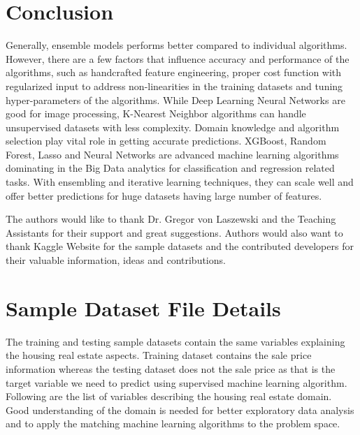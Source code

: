 \documentclass[sigconf]{acmart}
\begin{document}
	
	\section{Conclusion}
	
	Generally, ensemble models performs better compared to individual algorithms. However, there are a few factors that influence accuracy and performance of the algorithms, such as handcrafted feature engineering, proper cost function with regularized input to address non-linearities in the training datasets and tuning hyper-parameters of the algorithms. While Deep Learning Neural Networks are good for image processing, K-Nearest Neighbor algorithms can handle unsupervised datasets with less complexity. Domain knowledge and algorithm selection play vital role in getting accurate predictions. XGBoost, Random Forest, Lasso and Neural Networks are advanced machine learning algorithms dominating in the Big Data analytics for classification and regression related tasks. With ensembling and iterative learning techniques, they can scale well and offer better predictions for huge datasets having large number of features. 
	
	\appendix
	
	\nocite{*}
	
	\begin{acks}	
		The authors would like to thank Dr. Gregor von Laszewski and the Teaching Assistants for their support and great suggestions. Authors would also want to thank Kaggle Website for the sample datasets and the contributed developers for their valuable information, ideas and contributions.		
	\end{acks}
	
	
	
	 	
	
	\section{Sample Dataset File Details}
	The training and testing sample datasets contain the same variables explaining the housing real estate aspects. Training dataset contains the sale price information whereas the testing dataset does not the sale price as that is the target variable we need to predict using supervised machine learning algorithm. Following are the list of variables describing the housing real estate domain. Good understanding of the domain is needed for better exploratory data analysis and to apply the matching machine learning algorithms to the problem space.
	
\end{document}
